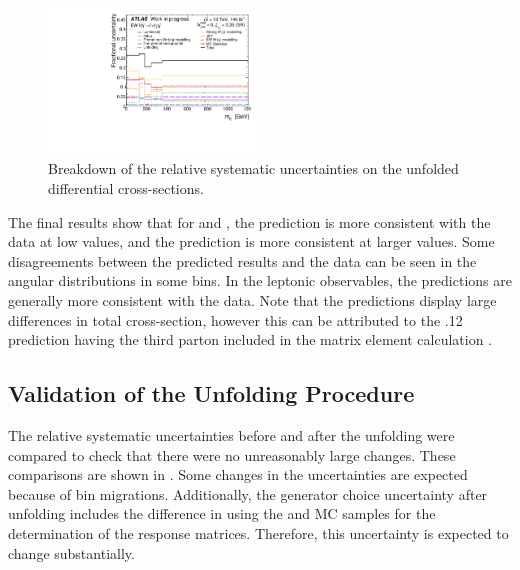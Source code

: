 \begin{figure}[t]
  \includegraphics[width=0.49\textwidth]{plots/diffx/uncdiffx/unc_lines_ly_m_WIP_12Feb.pdf}
  \caption{Breakdown of the relative systematic uncertainties on the unfolded differential cross-sections.\label{fig:vbswy:diffxunc}}
\end{figure}

The final results show that for \mjj and \ptjj, the \MADGRAPH prediction is more consistent with the data at low values, and the \SHERPA prediction is more consistent at larger values. Some disagreements between the predicted \MADGRAPH results and the data can be seen in the angular distributions in some bins. In the leptonic observables, the \SHERPA predictions are generally more consistent with the data. Note that the predictions display large differences in total cross-section, however this can be attributed to the .12 prediction having the third parton included in the matrix element calculation \cite{VBSWy:SherpaME}. 

\subsection{Validation of the Unfolding Procedure}

The relative systematic uncertainties before and after the unfolding were compared to check that there were no unreasonably large changes. These comparisons are shown in . Some changes in the uncertainties are expected because of bin migrations. Additionally, the \ewwy generator choice uncertainty after unfolding includes the difference in using the \SHERPA and \MADGRAPH MC samples for the determination of the response matrices. Therefore, this uncertainty is expected to change substantially.

